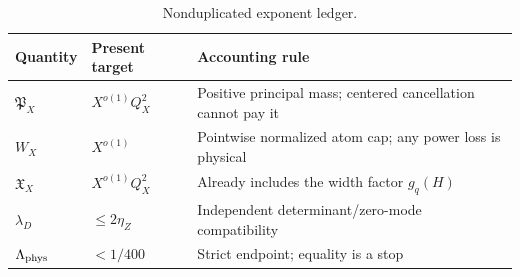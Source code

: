 \begin{table}[ht]
\centering
\small
\begin{tabularx}{\textwidth}{@{}
 p{}
 p{}
 X@{}}
\toprule
Quantity & Present target & Accounting rule\\
\midrule
\(\mathfrak P_X\) &
\(X^{o(1)}Q_X^2\) &
Positive principal mass; centered cancellation cannot pay it
\\
\(W_X\) &
\(X^{o(1)}\) &
Pointwise normalized atom cap; any power loss is physical
\\
\(\mathfrak X_X\) &
\(X^{o(1)}Q_X^2\) &
Already includes the width factor \(g_q(H)\)
\\
\(\lambda_D\) &
\(\le2\eta_Z\) &
Independent determinant/zero-mode compatibility
\\
\(\Lambda_{\rm phys}\) &
\(<1/400\) &
Strict endpoint; equality is a stop
\\
\bottomrule
\end{tabularx}
\caption{Nonduplicated exponent ledger.}
\label{tab:exponent-ledger}
\end{table}
